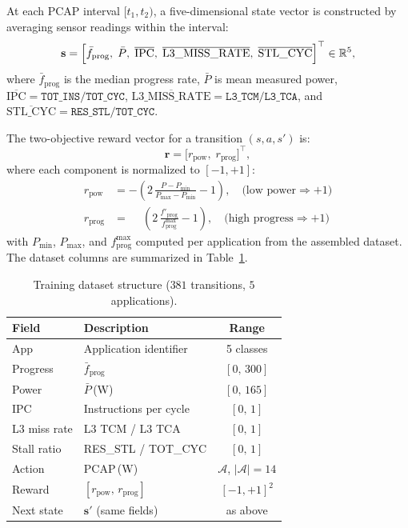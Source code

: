   At each PCAP interval $[t_1, t_2)$, a five-dimensional state vector is
  constructed by averaging sensor readings within the interval:
  \begin{equation}
      \mathbf{s} = \Bigl[
          \bar{f}_{\text{prog}},\;
          \bar{P},\;
          \overline{\text{IPC}},\;
          \overline{\text{L3\_MISS\_RATE}},\;
          \overline{\text{STL\_CYC}}
      \Bigr]^{\top} \in \mathbb{R}^{5},
  \end{equation}
  where $\bar{f}_{\text{prog}}$ is the median progress rate, $\bar{P}$ is mean
  measured power, $\overline{\text{IPC}} = \texttt{TOT\_INS}/\texttt{TOT\_CYC}$,
  $\overline{\text{L3\_MISS\_RATE}} = \texttt{L3\_TCM}/\texttt{L3\_TCA}$, and
  $\overline{\text{STL\_CYC}} = \texttt{RES\_STL}/\texttt{TOT\_CYC}$.

  The two-objective reward vector for a transition $(s, a, s')$ is:
  \begin{equation}
      \mathbf{r} = \bigl[r_{\text{pow}},\; r_{\text{prog}}\bigr]^{\top},
  \end{equation}
  where each component is normalized to $[-1, +1]$:
  \begin{align}
      r_{\text{pow}}  &= -\!\left(2\,\frac{P - P_{\min}}{P_{\max} - P_{\min}} - 1\right),
      \quad\text{(low power} \Rightarrow +1\text{)} \\
      r_{\text{prog}} &= \phantom{-}\left(2\,\frac{f'_{\text{prog}}}{f_{\text{prog}}^{\max}} - 1\right),
      \quad\text{(high progress} \Rightarrow +1\text{)}
  \end{align}
  with $P_{\min}$, $P_{\max}$, and $f_{\text{prog}}^{\max}$ computed per
  application from the assembled dataset. The dataset columns are summarized in
  Table~\ref{tab:dataset}.

  \begin{table}[h]
  \centering
  \caption{Training dataset structure ($381$ transitions, $5$ applications).}
  \label{tab:dataset}
  \begin{tabular}{llc}
  \toprule
  \textbf{Field} & \textbf{Description} & \textbf{Range} \\
  \midrule
  App            & Application identifier        & 5 classes \\
  Progress       & $\bar{f}_{\text{prog}}$       & $[0,\,300]$ \\
  Power          & $\bar{P}$\,(W)                & $[0,\,165]$ \\
  IPC            & Instructions per cycle        & $[0,\,1]$   \\
  L3 miss rate   & L3 TCM / L3 TCA              & $[0,\,1]$   \\
  Stall ratio    & RES\_STL / TOT\_CYC           & $[0,\,1]$   \\
  Action         & PCAP\,(W)                     & $\mathcal{A}$, $|\mathcal{A}|=14$ \\
  Reward         & $[r_{\text{pow}},\,r_{\text{prog}}]$ & $[-1,+1]^2$ \\
  Next state     & $\mathbf{s}'$ (same fields)   & as above \\
  \bottomrule
  \end{tabular}
  \end{table}

